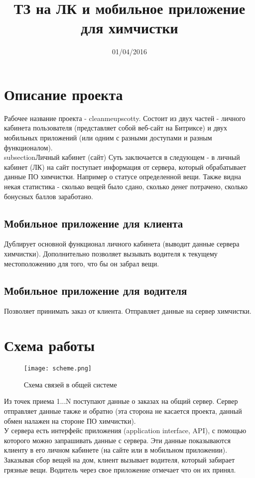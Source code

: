 \documentclass[DIV=calc, paper=a4, fontsize=11pt]{scrartcl} %
\title{ТЗ на ЛК и мобильное приложение для химчистки}
\date{01/04/2016}
\begin{document}
\maketitle

\section{Описание проекта}
Рабочее название проекта - cleanmeupscotty. Состоит из двух частей - личного кабинета пользователя (представляет собой веб-сайт на Битриксе) и двух мобильных приложений (или одним с разными доступами и разным функционалом).
\\subsection{Личный кабинет (сайт)}
Суть заключается в следующем - в личный кабинет (ЛК) на сайт поступает информация от сервера, который обрабатывает данные ПО химчистки. Например о статусе определенной вещи. Также видна некая статистика - сколько вещей было сдано, сколько денег потрачено, сколько бонусных баллов заработано.
\subsection{Мобильное приложение для клиента}
Дублирует основной функционал личного кабинета (выводит данные сервера химчистки). Дополнительно позволяет вызывать водителя к текущему местоположению для того, что бы он забрал вещи.
\subsection{Мобильное приложение для водителя}
Позволяет принимать заказ от клиента. Отправляет данные на сервер химчистки.


\section{Схема работы}

	\begin{figure}[H]
        \centering
        \texttt{[image: scheme.png]}
        \caption{Схема связей в общей системе\label{fig:scheme.png}}
    \end{figure}
    
Из точек приема 1...N поступают данные о заказах на общий сервер. Сервер отправляет данные также и обратно (эта сторона не касается проекта, данный обмен налажен на стороне ПО химчистки).
\\[0.5cm]
У сервера есть интерфейс приложения (application interface, API), с помощью которого можно запрашивать данные с сервера. Эти данные показываются клиенту в его личном кабинете (на сайте или в мобильном приложении).
\\[0.5cm]
Заказывая сбор вещей на дом, клиент вызывает водителя, который забирает грязные вещи. Водитель через свое приложение отмечает что он их принял. 
\end{document}
